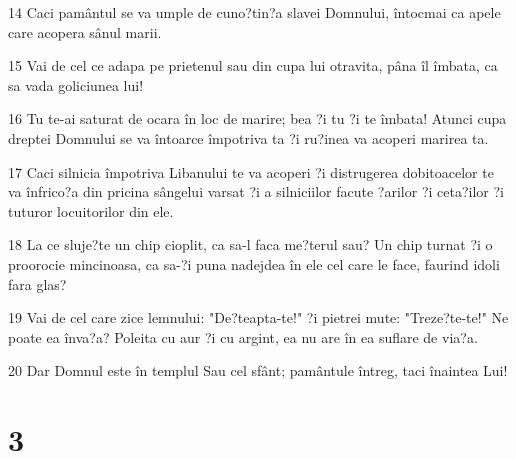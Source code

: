 \par 14 Caci pamântul se va umple de cuno?tin?a slavei Domnului, întocmai ca apele care acopera sânul marii.
\par 15 Vai de cel ce adapa pe prietenul sau din cupa lui otravita, pâna îl îmbata, ca sa vada goliciunea lui!
\par 16 Tu te-ai saturat de ocara în loc de marire; bea ?i tu ?i te îmbata! Atunci cupa dreptei Domnului se va întoarce împotriva ta ?i ru?inea va acoperi marirea ta.
\par 17 Caci silnicia împotriva Libanului te va acoperi ?i distrugerea dobitoacelor te va înfrico?a din pricina sângelui varsat ?i a silniciilor facute ?arilor ?i ceta?ilor ?i tuturor locuitorilor din ele.
\par 18 La ce sluje?te un chip cioplit, ca sa-l faca me?terul sau? Un chip turnat ?i o proorocie mincinoasa, ca sa-?i puna nadejdea în ele cel care le face, faurind idoli fara glas?
\par 19 Vai de cel care zice lemnului: "De?teapta-te!" ?i pietrei mute: "Treze?te-te!" Ne poate ea înva?a? Poleita cu aur ?i cu argint, ea nu are în ea suflare de via?a.
\par 20 Dar Domnul este în templul Sau cel sfânt; pamântule întreg, taci înaintea Lui!

\chapter{3}

